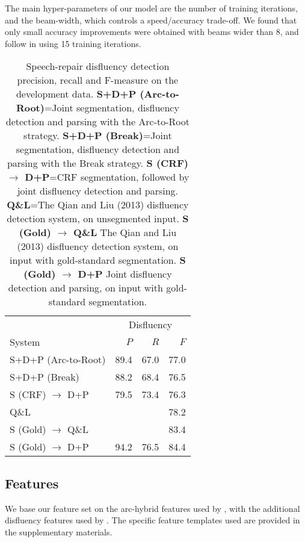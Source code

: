 \documentclass[11pt,letterpaper]{article}
\begin{document}
The main hyper-parameters of our model are the number of training iterations,
and the beam-width, which controls a speed/accuracy trade-off.  We found that
only small accuracy improvements were obtained with beams wider than 8, and follow
\citet{honnibal:14} in using 15 training iterations.  

\begin{table}
    \centering
    \small
    \begin{tabular}{l|rrr}
               & \multicolumn{3}{c}{Disfluency} \\
        System & $P$ & $R$ & $F$ \\
        \hline \hline
        S+D+P (Arc-to-Root) & 89.4 & 67.0 & 77.0 \\
        S+D+P (Break) & 88.2 & 68.4 & 76.5 \\
        S (CRF) $\rightarrow$ D+P & 79.5 & 73.4 & 76.3 \\
        \hline
        Q\&L  & & & 78.2 \\
        \hline
        S (Gold) $\rightarrow$ Q\&L & & & 83.4 \\
        S (Gold) $\rightarrow$ D+P & 94.2 & 76.5 & 84.4 \\
        \hline
    \end{tabular}
    \caption{\small Speech-repair disfluency detection precision, recall and
        F-measure on the development data.
        \textbf{S+D+P (Arc-to-Root)}=Joint segmentation, disfluency detection
        and parsing with the Arc-to-Root strategy.
        \textbf{S+D+P (Break)}=Joint
        segmentation, disfluency detection and parsing with the Break strategy.
        \textbf{S (CRF) $\rightarrow$ D+P}=CRF segmentation, followed by joint
        disfluency detection and parsing.
        \textbf{Q\&L}=The Qian and Liu (2013)
        disfluency detection system, on unsegmented input.
        \textbf{S (Gold) $\rightarrow$ Q\&L} The Qian and Liu (2013) disfluency
        detection system, on input with gold-standard segmentation.
        \textbf{S (Gold) $\rightarrow$ D+P} Joint disfluency detection and parsing,
             on input with gold-standard segmentation. \label{tab:dfl}}
\vspace*{-4em}
\end{table}

\subsection{Features}

We base our feature set on the arc-hybrid features used by
\citet{goldberg:13},
with the additional disfluency features used by \citet{honnibal:14}.  The
specific feature templates used are provided in the supplementary materials.
\end{document}
